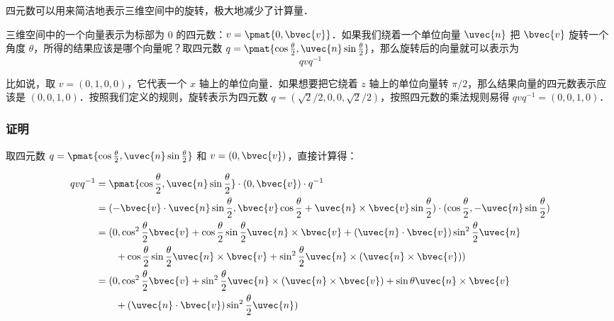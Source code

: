 
\begin{issues}
\issueAbstract
\issueTODO
\end{issues}


四元数可以用来简洁地表示三维空间中的旋转，极大地减少了计算量．

三维空间中的一个向量表示为标部为 $0$ 的四元数：$v=\pmat{0, \bvec{v}}$．如果我们绕着一个单位向量 ${\uvec{n}}$ 把 $\bvec{v}$ 旋转一个角度 $\theta$，所得的结果应该是哪个向量呢？取四元数 $q=\pmat{\cos{\frac{\theta}{2}}, {\uvec{n}}\sin{\frac{\theta}{2}}}$，那么旋转后的向量就可以表示为
\begin{equation}
qvq^{-1}
\end{equation}

比如说，取 $v=(0, 1, 0, 0)$，它代表一个 $x$ 轴上的单位向量．如果想要把它绕着 $z$ 轴上的单位向量转 $\pi/2$，那么结果向量的四元数表示应该是 $(0, 0, 1, 0)$．按照我们定义的规则，旋转表示为四元数 $q=(\sqrt{2}/2, 0, 0, \sqrt{2}/2)$，按照四元数的乘法规则易得 $qvq^{-1}=(0,0,1,0)$．

\subsubsection{证明}

取四元数 $q=\pmat{\cos{\frac{\theta}{2}}, {\uvec{n}}\sin{\frac{\theta}{2}}}$ 和 $v=(0, \bvec{v})$，直接计算得：

\begin{equation}
\begin{aligned}
qvq^{-1}&=\pmat{\cos{\frac{\theta}{2}}, {\uvec{n}}\sin{\frac{\theta}{2}}}\cdot (0, \bvec{v})\cdot q^{-1}\\&
=(-\bvec{v}\cdot {\uvec{n}}\sin{\frac{\theta}{2}}, \bvec{v}\cos{\frac{\theta}{2}}+ {\uvec{n}}\times\bvec{v}\sin{\frac{\theta}{2}})\cdot (\cos{\frac{\theta}{2}}, -{\uvec{n}}\sin{\frac{\theta}{2}})\\&
=(0, \cos^2\frac{\theta}{2}\bvec{v}+\cos\frac{\theta}{2}\sin\frac{\theta}{2}{\uvec{n}}\times\bvec{v}+({\uvec{n}}\cdot\bvec{v})\sin^2\frac{\theta}{2}{\uvec{n}}\\&
\qquad +\cos\frac{\theta}{2}\sin\frac{\theta}{2}{\uvec{n}}\times\bvec{v}+\sin^2\frac{\theta}{2}{\uvec{n}}\times({\uvec{n}}\times\bvec{v}))\\&
=(0, \cos^2\frac{\theta}{2}\bvec{v}+\sin^2\frac{\theta}{2}{\uvec{n}}\times({\uvec{n}}\times\bvec{v})+\sin\theta{\uvec{n}}\times\bvec{v}\\&
\qquad +({\uvec{n}}\cdot\bvec{v})\sin^2\frac{\theta}{2}{\uvec{n}})
\end{aligned}
\end{equation}

